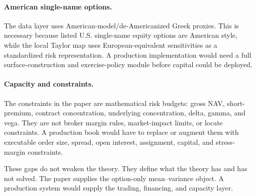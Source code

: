 \paragraph{American single-name options.}
The data layer uses American-model/de-Americanized Greek proxies. This is necessary
because listed U.S. single-name equity options are American style, while the local Taylor
map uses European-equivalent sensitivities as a standardized risk representation. A
production implementation would need a full surface-construction and exercise-policy
module before capital could be deployed.

\paragraph{Capacity and constraints.}
The constraints in the paper are mathematical risk budgets: gross NAV, short-premium,
contract concentration, underlying concentration, delta, gamma, and vega. They are not
broker margin rules, market-impact limits, or locate constraints. A production book would
have to replace or augment them with executable order size, spread, open interest,
assignment, capital, and stress-margin constraints.

These gaps do not weaken the theory. They define what the theory has and has not solved.
The paper supplies the option-only mean--variance object. A production system would supply
the trading, financing, and capacity layer.
